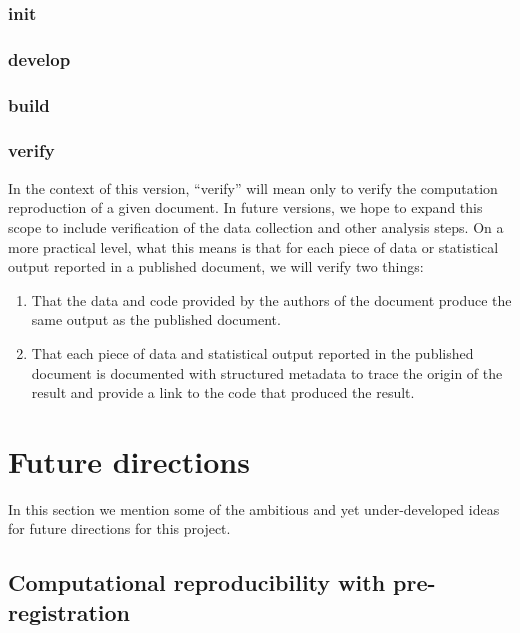 \hypertarget{init}{%
\subsubsection{init}\label{init}}

\hypertarget{develop}{%
\subsubsection{develop}\label{develop}}

\hypertarget{build}{%
\subsubsection{build}\label{build}}

\hypertarget{verify}{%
\subsubsection{verify}\label{verify}}

In the context of this version, ``verify'' will mean only to verify the computation reproduction of a given document. In future versions, we hope to expand this scope to include verification of the data collection and other analysis steps. On a more practical level, what this means is that for each piece of data or statistical output reported in a published document, we will verify two things:

\begin{enumerate}
\itemsep -0.2em
\item That the data and code provided by the authors of the document produce the same output as the published document.
\item That each piece of data and statistical output reported in the published document is documented with structured metadata to trace the origin of the result and provide a link to the code that produced the result.
\end{enumerate}

\hypertarget{future-directions}{%
\section{Future directions}\label{future-directions}}

In this section we mention some of the ambitious and yet under-developed ideas for future directions for this project.

\hypertarget{computational-reproducibility-with-pre-registration}{%
\subsection{Computational reproducibility with pre-registration}\label{computational-reproducibility-with-pre-registration}}

